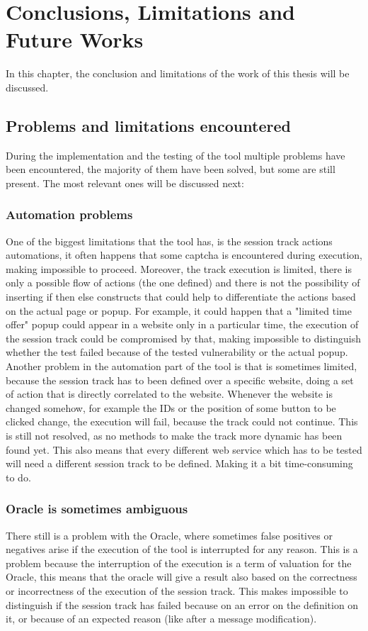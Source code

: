 \chapter{Conclusions, Limitations and Future Works}
\label{chap:Conclusions}
In this chapter, the conclusion and limitations of the work of this thesis will be discussed.

\section{Problems and limitations encountered}
During the implementation and the testing of the tool multiple problems have been encountered, the majority of them have been solved, but some are still present. The most relevant ones will be discussed next:

\subsection{Automation problems}
One of the biggest limitations that the tool has, is the session track actions automations, it often happens that some captcha is encountered during execution, making impossible to proceed. Moreover, the track execution is limited, there is only a possible flow of actions (the one defined) and there is not the possibility of inserting if then else constructs that could help to differentiate the actions based on the actual page or popup. For example, it could happen that a "limited time offer" popup could appear in a website only in a particular time, the execution of the session track could be compromised by that, making impossible to distinguish whether the test failed because of the tested vulnerability or the actual popup.
Another problem in the automation part of the tool is that is sometimes limited, because the session track has to been defined over a specific website, doing a set of action that is directly correlated to the website. Whenever the website is changed somehow, for example the IDs or the position of some button to be clicked change, the execution will fail, because the track could not continue.
This is still not resolved, as no methods to make the track more dynamic has been found yet. This also means that every different web service which has to be tested will need a different session track to be defined. Making it a bit time-consuming to do. 

\subsection{Oracle is sometimes ambiguous}
There still is a problem with the Oracle, where sometimes false positives or negatives arise if the execution of the tool is interrupted for any reason. This is a problem because the interruption of the execution is a term of valuation for the Oracle, this means that the oracle will give a result also based on the correctness or incorrectness of the execution of the \gls{session track}. This makes impossible to distinguish if the \gls{session track} has failed because on an error on the definition on it, or because of an expected reason (like after a message modification).

